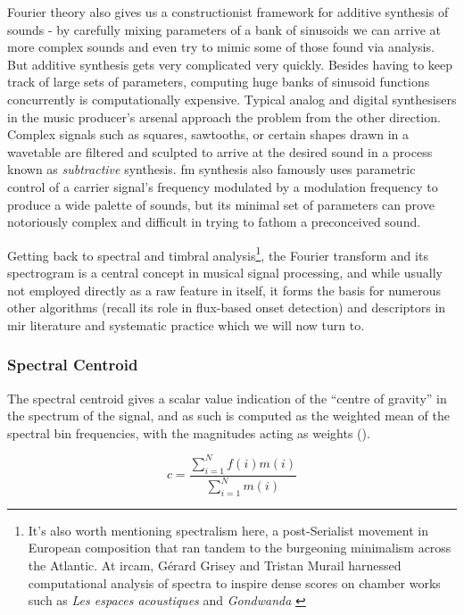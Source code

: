 {{Fourier theory also gives us a constructionist framework for additive synthesis of sounds - by carefully mixing parameters of a bank of sinusoids we can arrive at more complex sounds and even try to mimic some of those found via analysis. But additive synthesis gets very complicated very quickly. Besides having to keep track of large sets of parameters, computing huge banks of sinusoid functions concurrently is computationally expensive. Typical analog and digital synthesisers in the music producer's arsenal approach the problem from the other direction. Complex signals such as squares, sawtooths, or certain shapes drawn in a wavetable are filtered and sculpted to arrive at the desired sound in a process known as \textit{subtractive} synthesis. \acrfull{fm} synthesis also famously uses parametric control of a carrier signal's frequency modulated by a modulation frequency to produce a wide palette of sounds, but its minimal set of parameters can prove notoriously complex and difficult in trying to fathom a preconceived sound. 
 
Getting back to spectral and timbral analysis\footnote{It's also worth mentioning spectralism here, a post-Serialist movement in European composition that ran tandem to the burgeoning minimalism across the Atlantic. At \acrshort{ircam}, Gérard Grisey and Tristan Murail harnessed computational analysis of spectra to inspire dense scores on chamber works such as \textit{Les espaces acoustiques} and \textit{Gondwanda} \citep{ross2007rest, Harvey2000}}, the Fourier transform and its spectrogram is a central concept in musical signal processing, and while usually not employed directly as a raw feature in itself, it forms the basis for numerous other algorithms (recall its role in flux-based onset detection) and descriptors in \acrshort{mir} literature and systematic practice which we will now turn to. 

\subsubsection{Spectral Centroid}

The spectral centroid gives a scalar value indication of the ``centre of gravity'' in the spectrum of the signal, and as such is computed as the weighted mean of the spectral bin frequencies, with the magnitudes acting as weights ().

\begin{equation}
\label{eq:centroid}	
c = \frac{\sum_{i=1}^{N}f(i)m(i)}{\sum_{i=1}^{N}m(i)}
\end{equation}

}}
